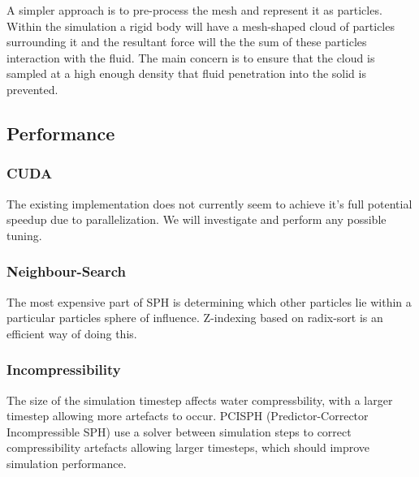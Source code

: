 \documentclass[10pt,a4paper,draft]{article}
\begin{document}
A simpler approach is to pre-process the mesh and represent it as particles. Within the simulation a rigid body will have a mesh-shaped cloud of particles surrounding it and the resultant force will the the sum of these particles interaction with the fluid. The main concern is to ensure that the cloud is sampled at a high enough density that fluid penetration into the solid is prevented.
 
 \subsection{Performance}

 \subsubsection{CUDA}
The existing implementation does not currently seem to achieve it's full potential speedup due to parallelization. We will investigate and perform any possible tuning.

\subsubsection{Neighbour-Search}
The most expensive part of SPH is determining which other particles lie within a particular particles sphere of influence. Z-indexing based on radix-sort is an efficient way of doing this.  
 
 \subsubsection{Incompressibility}
The size of the simulation timestep affects water compressbility, with a larger timestep allowing more artefacts to occur. PCISPH (Predictor-Corrector Incompressible  SPH) use a solver between simulation steps to correct compressibility artefacts allowing larger timesteps, which should improve simulation performance.

\cite{Akinci2012} 
 








\end{document}
